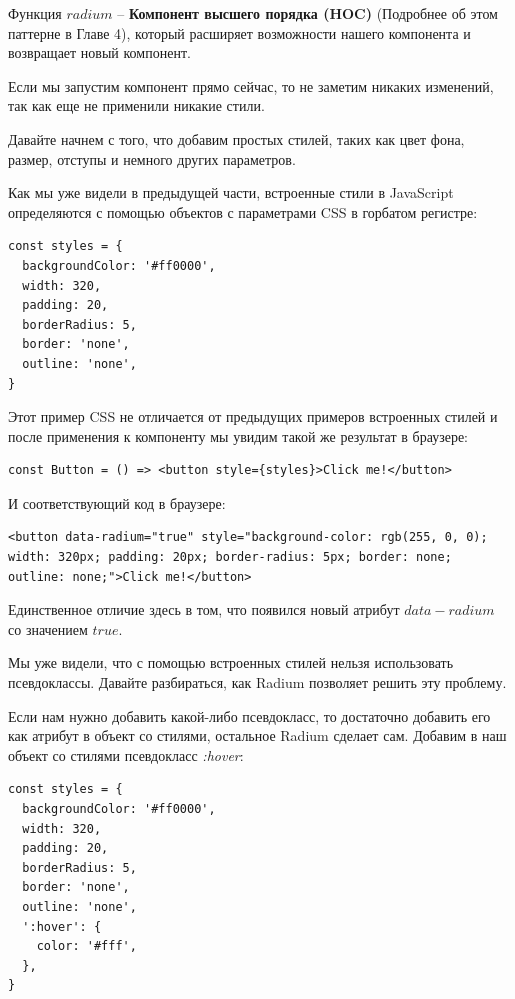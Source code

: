 Функция $radium$ -- \textbf{Компонент высшего порядка (HOC)} (Подробнее об этом паттерне в Главе 4), который расширяет возможности нашего компонента и возвращает новый компонент.

Если мы запустим компонент прямо сейчас, то не заметим никаких изменений, так как еще не применили никакие стили.

Давайте начнем с того, что добавим простых стилей, таких как цвет фона, размер, отступы и немного других параметров.

Как мы уже видели в предыдущей части, встроенные стили в JavaScript определяются с помощью объектов с параметрами CSS в горбатом регистре:

\begin{lstlisting}
const styles = {
  backgroundColor: '#ff0000',
  width: 320,
  padding: 20,
  borderRadius: 5,
  border: 'none',
  outline: 'none',
}
\end{lstlisting}

Этот пример CSS не отличается от предыдущих примеров встроенных стилей и после применения к компоненту мы увидим такой же результат в браузере:

\begin{lstlisting}
const Button = () => <button style={styles}>Click me!</button>
\end{lstlisting}

И соответствующий код в браузере:

\begin{lstlisting}
<button data-radium="true" style="background-color: rgb(255, 0, 0); width: 320px; padding: 20px; border-radius: 5px; border: none; outline: none;">Click me!</button>
\end{lstlisting}

Единственное отличие здесь в том, что появился новый атрибут $data-radium$ со значением $true$.

Мы уже видели, что с помощью встроенных стилей нельзя использовать псевдоклассы. Давайте разбираться, как Radium позволяет решить эту проблему.

Если нам нужно добавить какой-либо псевдокласс, то достаточно добавить его как атрибут в объект со стилями, остальное Radium сделает сам. Добавим в наш объект со стилями псевдокласс \textit{:hover}:

\begin{lstlisting}
const styles = {
  backgroundColor: '#ff0000',
  width: 320,
  padding: 20,
  borderRadius: 5,
  border: 'none',
  outline: 'none',
  ':hover': {
    color: '#fff',
  },
}
\end{lstlisting}

